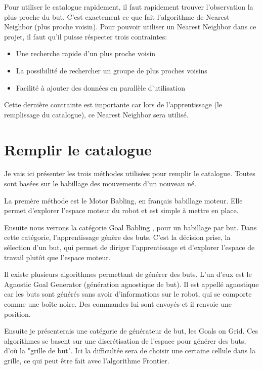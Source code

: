 \documentclass[11pt,french]{report}
\begin{document}
Pour utiliser le catalogue rapidement, il faut rapidement trouver l'observation la plus proche du but.
C'est exactement ce que fait l'algorithme de Nearest Neighbor (plus proche voisin).
Pour pouvoir utiliser un Nearest Neighbor dans ce projet, il faut qu'il puisse réspecter trois contraintes:
\begin{itemize}
    \item Une recherche rapide d'un plus proche voisin
    \item La possibilité de rechercher un groupe de plus proches voisins
    \item Facilité à ajouter des données en parallèle d'utilisation
\end{itemize}
Cette dernière contrainte est importante car lors de l'apprentissage (le remplissage du catalogue), ce Nearest Neighbor sera utilisé.

\pagebreak
\section{Remplir le catalogue}

Je vais ici présenter les trois méthodes utilisées pour remplir le catalogue.
Toutes sont basées sur le babillage des mouvements d'un nouveau né.

La premère méthode est le Motor Babling, en français babillage moteur.
Elle permet d'explorer l'espace moteur du robot et est simple à mettre en place.

\phantom{INVISIBLE LINE}

Ensuite nous verrons la catégorie Goal Babling \cite{GoalBabling}, pour un babillage par but.
Dans cette catégorie, l'apprentissage génère des buts.
C'est la décision prise, la sélection d'un but, qui permet de diriger l'apprentissage et d'explorer l'espace de travail plutôt que l'espace moteur.

Il existe plusieurs algorithmes permettant de générer des buts.
L'un d'eux est le Agnostic Goal Generator (génération agnostique de but).
Il est appellé agnostique car les buts sont générés sans avoir d'informations sur le robot, qui se comporte comme une boîte noire.
Des commandes lui sont envoyés et il renvoie une position.

Ensuite je présenterais une catégorie de générateur de but, les Goals on Grid.
Ces algorithmes se basent sur une discrétisation de l'espace pour générer des buts, d'où la "grille de but".
Ici la difficultée sera de choisir une certaine cellule dans la grille, ce qui peut être fait avec l'algorithme Frontier.
\end{document}
